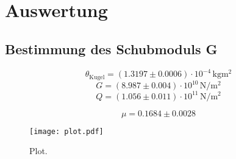 \section{Auswertung}
\label{sec:Auswertung}
\subsection{Bestimmung des Schubmoduls G}
\begin{equation}
	\theta_{\mathrm{Kugel}}=(1.3197\pm 0.0006) \cdot 10^{-4} \,\si{\kilo\gram \square\metre}
\end{equation}
\begin{equation}
	G= (8.987\pm 0.004) \cdot 10^{10}  \,\si{\newton \per \square\metre}
\end{equation}
\begin{equation}
	Q= (1.056\pm 0.011) \cdot 10^{11}  \,\si{\newton \per \square\metre}
\end{equation}

\begin{equation}
	\mu= 0.1684\pm 0.0028
\end{equation}
\begin{figure}
  \centering
  \texttt{[image: plot.pdf]}
  \caption{Plot.}
  \label{fig:plot}
\end{figure}
